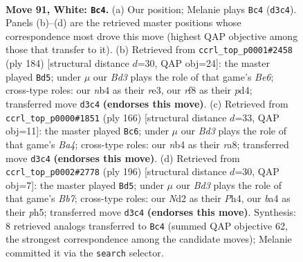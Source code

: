 \documentclass[11pt]{article}
\begin{document}
\clearpage

\begin{figure}[p]\centering
\begin{subfigure}{0.46\textwidth}\centering
\resizebox{\linewidth}{!}{%
\newchessgame
\chessboard[
  setfen={5r2/3k1p2/6p1/4P2p/bn3Pp1/3B4/3N1K1P/8 w - - 40 91},
  showmover=false,
  pgfstyle=straightmove, color=movearrow, markmove={d3-c4}
]}
\caption{}
\end{subfigure}\hfill
\begin{subfigure}{0.46\textwidth}\centering
\resizebox{\linewidth}{!}{%
\newchessgame
\chessboard[
  setfen={3B4/7p/p3B1pP/2k2p2/2Pp1P2/4r3/1K6/8 w - - 14 93},
  showmover=false,
  pgfstyle=straightmove, color=movearrow, markmove={e6-d5}
]}
\caption{}
\end{subfigure}
\\[4pt]
\begin{subfigure}{0.46\textwidth}\centering
\resizebox{\linewidth}{!}{%
\newchessgame
\chessboard[
  setfen={r7/4k3/4p1P1/3p1p2/B2P4/3NP3/6K1/8 w - - 8 84},
  showmover=false,
  pgfstyle=straightmove, color=movearrow, markmove={a4-c6}
]}
\caption{}
\end{subfigure}\hfill
\begin{subfigure}{0.46\textwidth}\centering
\resizebox{\linewidth}{!}{%
\newchessgame
\chessboard[
  setfen={5k2/1B6/6p1/2p1pp1p/2P1p2P/6P1/3K4/8 w - - 80 99},
  showmover=false,
  pgfstyle=straightmove, color=movearrow, markmove={b7-d5}
]}
\caption{}
\end{subfigure}
\caption{\textbf{Move 91, White: \texttt{Bc4}.} (a) Our position; Melanie plays \texttt{Bc4} (\texttt{d3c4}). Panels (b)--(d) are the retrieved master positions whose correspondence most drove this move (highest QAP objective among those that transfer to it). (b) Retrieved from \texttt{ccrl\_top\_p0001\#2458} (ply 184) [structural distance $d$=30, QAP obj=24]: the master played \texttt{Bd5}; under $\mu$ our \emph{Bd3} plays the role of that game's \emph{Be6}; cross-type roles: our \emph{n}b4 as their \emph{r}e3, our \emph{r}f8 as their \emph{p}d4; transferred move \texttt{d3c4} \textbf{(endorses this move)}. (c) Retrieved from \texttt{ccrl\_top\_p0000\#1851} (ply 166) [structural distance $d$=33, QAP obj=11]: the master played \texttt{Bc6}; under $\mu$ our \emph{Bd3} plays the role of that game's \emph{Ba4}; cross-type roles: our \emph{n}b4 as their \emph{r}a8; transferred move \texttt{d3c4} \textbf{(endorses this move)}. (d) Retrieved from \texttt{ccrl\_top\_p0002\#2778} (ply 196) [structural distance $d$=30, QAP obj=7]: the master played \texttt{Bd5}; under $\mu$ our \emph{Bd3} plays the role of that game's \emph{Bb7}; cross-type roles: our \emph{N}d2 as their \emph{P}h4, our \emph{b}a4 as their \emph{p}h5; transferred move \texttt{d3c4} \textbf{(endorses this move)}. Synthesis: 8 retrieved analogs transferred to \texttt{Bc4} (summed QAP objective 62, the strongest correspondence among the candidate moves); Melanie committed it via the \texttt{search} selector.}
\label{fig:thought-m180}
\end{figure}
\end{document}
